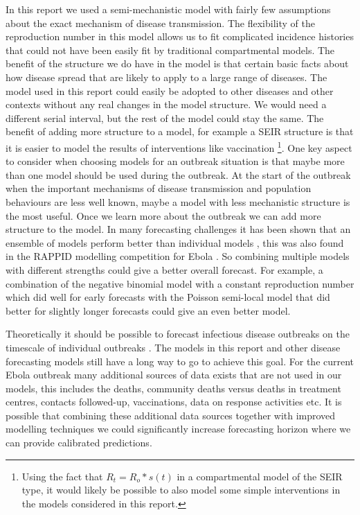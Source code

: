 \documentclass[12pt]{article}
\begin{document}
In this report we used a semi-mechanistic model with fairly few assumptions about the exact mechanism of disease transmission. The flexibility of the reproduction number in this model allows us to fit complicated incidence histories that could not have been easily fit by traditional compartmental models. The benefit of the structure we do have in the model is that certain basic facts about how disease spread that are likely to apply to a large range of diseases. The model used in this report could easily be adopted to other diseases and other contexts without any real changes in the model structure. We would need a different serial interval, but the rest of the model could stay the same. The benefit of adding more structure to a model, for example a SEIR structure is that it is easier to model the results of interventions like vaccination \footnote{Using the fact that $R_t=R_o*s(t)$ in a compartmental model of the SEIR type, it would likely be possible to also model some simple interventions in the models considered in this report.}. One key aspect to consider when choosing models for an outbreak situation is that maybe more than one model should be used during the outbreak. At the start of the outbreak when the important mechanisms of disease transmission and population behaviours are less well known, maybe a model with less mechanistic structure is the most useful. Once we learn more about the outbreak we can add more structure to the model. In many forecasting challenges it has been shown that an ensemble of models perform better than individual models \cite{dietterichEnsembleMethodsMachine2000, yaoUsingStackingAverage2018}, this was also found in the RAPPID modelling competition for Ebola \cite{viboudRAPIDDEbolaForecasting2018}. So combining multiple models with different strengths could give a better overall forecast. For example, a combination of the negative binomial model with a constant reproduction number which did well for early forecasts with the Poisson semi-local model that did better for slightly longer forecasts could give an even better model.

Theoretically it should be possible to forecast infectious disease outbreaks on the timescale of individual outbreaks \cite{scarpinoPredictabilityInfectiousDisease2019}. The models in this report and other disease forecasting models still have a long way to go to achieve this goal. For the current Ebola outbreak many additional sources of data exists that are not used in our models, this includes the deaths, community deaths versus deaths in treatment centres, contacts followed-up, vaccinations, data on response activities etc. It is possible that combining these additional data sources together with improved modelling techniques we could significantly increase forecasting horizon where we can provide calibrated predictions. 
\end{document}
